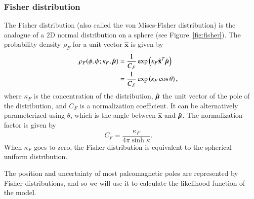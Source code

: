 \documentclass[preprint,12pt,authoryear]{elsarticle}
\newcommand{\mitbf}[1]{\hbox{\mathversion{bold}$#1$}}
\begin{document}
\subsubsection{Fisher distribution}
The Fisher distribution (also called the von Mises-Fisher distribution) is the analogue
of a 2D normal distribution on a sphere (see Figure~\ref{fig:fisher}).
The probability density $\rho_F$ for a unit vector $\hat{\mathbf{x}}$ is given by
\begin{equation}
  \begin{aligned}
  \rho_F(\phi, \psi ; \kappa_F, \hat{\mitbf{\mu}}) 
  &= \frac{1}{C_F} \exp \left( \kappa_F \hat{\mathbf{x}}^T \hat{\mitbf{\mu}} \right) \\
  &= \frac{1}{C_F} \exp \left( \kappa_F \cos \theta \right),
  \end{aligned}
\end{equation}
where $\kappa_F$ is the concentration of the distribution, 
$\hat{\mitbf{\mu}}$ the unit vector of the pole of the distribution, 
and $C_F$ is a normalization coefficient. It can be alternatively
parameterized using $\theta$, which is the angle between $\hat{\mathbf{x}}$ and $\hat{\mitbf{\mu}}$.
The normalization factor is given by 
\begin{equation}
  C_F = \frac{\kappa_F}{4 \pi \sinh{\kappa}}.
\end{equation}
When $\kappa_F$ goes to zero, the Fisher distribution is equivalent to the spherical uniform distribution.

The position and uncertainty of most paleomagnetic poles are represented by Fisher distributions,
and so we will use it to calculate the likelihood function of the model.
\end{document}
